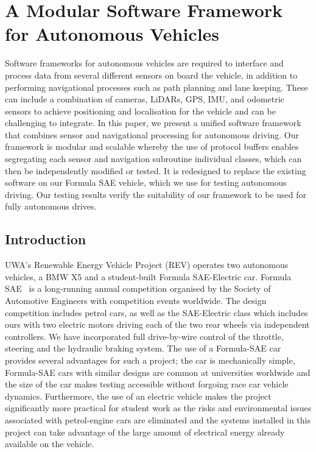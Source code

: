 
\chapter{A Modular Software Framework for Autonomous Vehicles}
\label{ch:modular}

\ifpdf
	\graphicspath{{Chapter6/Figs/Raster/}{Chapter6/Figs/PDF/}{Chapter6/Figs/}}
\else
	\graphicspath{{Chapter6/Figs/Vector/}{Chapter6/Figs/}}
\fi

Software frameworks for autonomous vehicles are required to interface and process data from several different sensors on board the vehicle, in addition to performing navigational processes such as path planning and lane keeping. These can include a combination of cameras, LiDARs, GPS, IMU, and odometric sensors to achieve positioning and localisation for the vehicle and can be challenging to integrate. In this paper, we present a unified software framework that combines sensor and navigational processing for autonomous driving. Our framework is modular and scalable whereby the use of protocol buffers enables segregating each sensor and navigation subroutine individual classes, which can then be independently modified or tested. It is redesigned to replace the existing software on our Formula SAE vehicle, which we use for testing autonomous driving. Our testing results verify the suitability of our framework to be used for fully autonomous drives.

\section{Introduction}
UWA's Renewable Energy Vehicle Project (REV) operates two autonomous vehicles, a BMW X5 and a student-built Formula SAE-Electric car. Formula SAE~\cite{sae_international_student_nodate} is a long-running annual competition organised by the Society of Automotive Engineers with competition events worldwide. The design competition includes petrol cars, as well as the SAE-Electric class which includes ours with two electric motors driving each of the two rear wheels via independent controllers. We have incorporated full drive-by-wire control of the throttle, steering and the hydraulic braking system. The use of a Formula-SAE car provides several advantages for such a project; the car is mechanically simple, Formula-SAE cars with similar designs are common at universities worldwide and the size of the car makes testing accessible without forgoing race car vehicle dynamics. Furthermore, the use of an electric vehicle makes the project significantly more practical for student work as the risks and environmental issues associated with petrol-engine cars are eliminated and the systems installed in this project can take advantage of the large amount of electrical energy already available on the vehicle.


